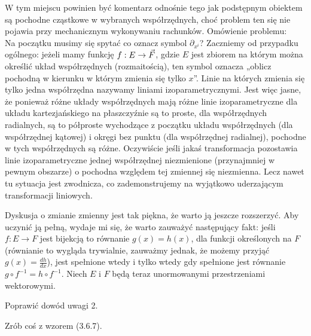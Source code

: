 \documentclass[a4paper,11pt]{article}
\numberwithin{equation}{section}
\begin{document}
\noindent
{} W tym miejscu powinien być komentarz odnośnie tego
jak podstępnym obiektem są pochodne cząstkowe w wybranych
współrzędnych, choć problem ten się nie pojawia przy mechanicznym
wykonywaniu rachunków.
Omówienie problemu: \\
Na początku musimy się spytać co oznacz symbol $\partial_{ x^{ i } }$?
Zaczniemy od przypadku ogólnego: jeżeli mamy funkcję
$f : E \to \vec{F}$, gdzie $E$ jest zbiorem na którym można określić
układ współrzędnych (rozmaitością), ten symbol oznacza „oblicz
pochodną w kierunku w którym zmienia się tylko $x$”. Linie na których
zmienia się tylko jedna współrzędna nazywamy liniami
izoparametrycznymi. Jest więc jasne, że ponieważ różne układy
współrzędnych mają różne linie izoparametryczne dla układu
kartezjańskiego na płaszczyźnie są to proste, dla współrzędnych
radialnych, są to półproste wychodzące z początku układu współrzędnych
(dla współrzędnej kątowej) i okręgi bez punktu (dla współrzędnej
radialnej), pochodne w tych współrzędnych są różne. Oczywiście jeśli
jakaś transformacja pozostawia linie izoparametryczne jednej
współrzędnej niezmienione (przynajmniej w pewnym obszarze) o pochodna
względem tej zmiennej się niezmienna. Lecz nawet tu sytuacja jest
zwodnicza, co zademonstrujemy na wyjątkowo uderzającym
transformacji liniowych.

\VerSpaceFour





\noindent
{} Dyskusja o zmianie zmienny jest tak piękna, że warto
ją jeszcze rozszerzyć. Aby uczynić ją pełną, wydaje mi się, że warto
zauważyć następujący fakt: jeśli $f : E \to F$ jest bijekcją to
równanie $g( x ) = h( x )$, dla funkcji określonych na $F$ (równianie
to wygląda trywialnie, zauważmy jednak, że możemy przyjąć
$g( x ) = \frac{ d h }{ dx }$), jest spełnione wtedy i tylko wtedy
gdy spełnione jest równanie $g \circ f^{ -1 } = h \circ f^{ -1 }$.
Niech $E$ i $F$ będą teraz unormowanymi przestrzeniami wektorowymi.

\VerSpaceFour





\noindent
{} Poprawić dowód uwagi 2.

\VerSpaceFour





\noindent
{} Zrób coś z wzorem (3.6.7).

\VerSpaceFour
\end{document}
